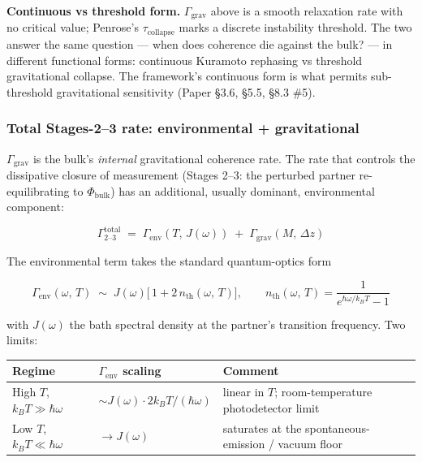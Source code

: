 \documentclass[
]{article}
\newcounter{none} %
\begin{document}
\textbf{Continuous vs threshold form.} \(\Gamma_{\text{grav}}\) above is
a smooth relaxation rate with no critical value; Penrose's
\(\tau_{\text{collapse}}\) marks a discrete instability threshold. The
two answer the same question --- when does coherence die against the
bulk? --- in different functional forms: continuous Kuramoto rephasing
vs threshold gravitational collapse. The framework's continuous form is
what permits sub-threshold gravitational sensitivity (Paper §3.6, §5.5,
§8.3 \#5).

\subsubsection{Total Stages-2--3 rate: environmental +
gravitational}\label{total-stages-23-rate-environmental-gravitational}

\(\Gamma_{\text{grav}}\) is the bulk's \emph{internal} gravitational
coherence rate. The rate that controls the dissipative closure of
measurement (Stages 2--3: the perturbed partner re-equilibrating to
\(\Phi_{\text{bulk}}\)) has an additional, usually dominant,
environmental component:

\[\boxed{\Gamma_{\text{2–3}}^{\text{total}} \;=\; \Gamma_{\text{env}}(T,\,J(\omega)) \;+\; \Gamma_{\text{grav}}(M,\,\Delta z)}\]

The environmental term takes the standard quantum-optics form

\[\Gamma_{\text{env}}(\omega,\,T) \;\sim\; J(\omega)\bigl[\,1 + 2\,n_{\text{th}}(\omega,\,T)\bigr], \qquad n_{\text{th}}(\omega,\,T) = \frac{1}{e^{\hbar\omega/k_BT}-1}\]

with \(J(\omega)\) the bath spectral density at the partner's transition
frequency. Two limits:

{\def\LTcaptype{none} %
\begin{longtable}[]{@{}
  >{\raggedright\arraybackslash}p{}
  >{\raggedright\arraybackslash}p{}
  >{\raggedright\arraybackslash}p{}@{}}
\toprule\noalign{}
\begin{minipage}[b]{\linewidth}\raggedright
Regime
\end{minipage} & \begin{minipage}[b]{\linewidth}\raggedright
\(\Gamma_{\text{env}}\) scaling
\end{minipage} & \begin{minipage}[b]{\linewidth}\raggedright
Comment
\end{minipage} \\
\midrule\noalign{}
\endhead
\bottomrule\noalign{}
\endlastfoot
High \(T\), \(k_BT \gg \hbar\omega\) &
\(\sim J(\omega) \cdot 2k_BT/(\hbar\omega)\) & linear in \(T\);
room-temperature photodetector limit \\
Low \(T\), \(k_BT \ll \hbar\omega\) & \(\to J(\omega)\) & saturates at
the spontaneous-emission / vacuum floor \\
\end{longtable}
}
\end{document}
